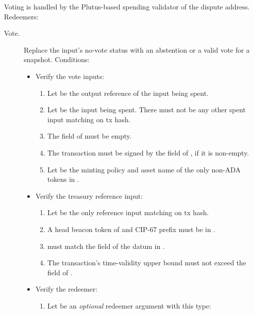 \documentclass[../hydrozoa.tex]{subfiles}
\begin{document}
Voting is handled by the Plutus-based spending validator of the dispute address.
Redeemers:
\begin{description}
  \item[Vote.] Replace the input's no-vote status with an abstention or a valid vote for a snapshot. Conditions:
    \begin{itemize}
      \item Verify the vote inputs:
        \begin{enumerate}
          \item Let  be the output reference of the input being spent.
          \item Let  be the input being spent.
            There must not be any other spent input matching  on tx hash.
          \item The  field of  must be empty.
          \item The transaction must be signed by the  field of , if it is non-empty.
          \item Let  be the minting policy and asset name of the only non-ADA tokens in .
        \end{enumerate}
      \item Verify the treasury reference input:
        \begin{enumerate}[resume]
          \item Let  be the only reference input matching  on tx hash.
          \item A head beacon token of  and CIP-67 prefix  must be in .
          \item {} must match the  field of the  datum in .
          \item The transaction's time-validity upper bound must not exceed the  field of .
        \end{enumerate}
      \item Verify the redeemer:
        \begin{enumerate}[resume]
          \item Let  be an \emph{optional} redeemer argument with this type:
            \begin{equation*}
            \begin{split}

\end{split}
\end{equation*}
\end{enumerate}
\end{itemize}
\end{description}
\end{document}
